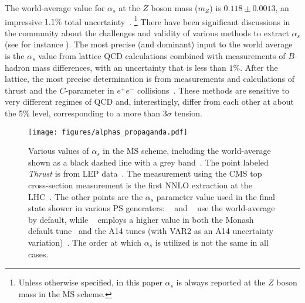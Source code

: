 The world-average value for $\alpha_s$ at the $Z$ boson mass ($m_Z$) is $0.118\pm 0.0013$, an impressive $1.1\%$ total uncertainty~\cite{Olive:2016xmw}.%
\footnote{Unless otherwise specified, in this paper $\alpha_s$ is always reported at the $Z$ boson mass in the $\overline{\text{MS}}$ scheme.} 
%
There have been significant discussions in the community about the challenges and validity of various methods to extract $\alpha_s$ (see for instance ).
%
The most precise (and dominant) input to the world average is the $\alpha_s$ value from lattice QCD calculations combined with measurements of $B$-hadron mass differences, with an uncertainty that is less than $1\%$. 
%
After the lattice, the most precise determination is from measurements and calculations of thrust and the $C$-parameter in $e^+e^-$ collisions~\cite{Abbate:2010xh,Hoang:2015hka,Heister:2003aj,Abdallah:2004xe,Abreu:1996mk,Abreu:1999rc,Biebel:1999zt,Adeva:1992gv,Abbiendi:2004qz,Abe:1994mf}.
%
These methods are sensitive to very different regimes of QCD and, interestingly, differ from each other at about the 5\% level, corresponding to a more than $3\sigma$ tension.  



\begin{figure}[t]
\begin{center}
\texttt{[image: figures/alphas\_propaganda.pdf]}
\end{center}
\caption{Various values of $\alpha_s$ in the $\overline{\text{MS}}$ scheme, including the world-average shown as a black dashed line with a grey band~\cite{Olive:2016xmw}.
%
The point labeled \textit{Thrust} is from LEP data~\cite{Abbate:2010xh,Hoang:2015hka,Heister:2003aj,Abdallah:2004xe,Abreu:1996mk,Abreu:1999rc,Biebel:1999zt,Adeva:1992gv,Abbiendi:2004qz,Abe:1994mf}.
%
The measurement using the CMS top cross-section measurement is the first NNLO extraction at the LHC~\cite{Chatrchyan:2013haa}.
%
The other points are the $\alpha_s$ parameter value used in the final state shower in various PS generaters: \herwig~\cite{Bellm:2015jjp} and \sherpa~\cite{Gleisberg:2008ta} use the world-average by default, while \pythia~\cite{Sjostrand:2006za,Sjostrand:2014zea} employs a higher value in both the Monash default tune~\cite{Skands:2014pea} and the A14 tunes (with VAR2 as an A14 uncertainty variation)~\cite{ATL-PHYS-PUB-2014-021}.
%
The order at which $\alpha_s$ is utilized is not the same in all cases.}
\label{fig:propaganda}
\end{figure}


